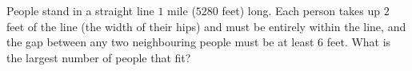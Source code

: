 People stand in a straight line $1$ mile ($5280$ feet) long. Each person takes up $2$ feet of the line (the width of their hips) and must be entirely within the line, and the gap between any two neighbouring people must be at least $6$ feet. What is the largest number of people that fit?
